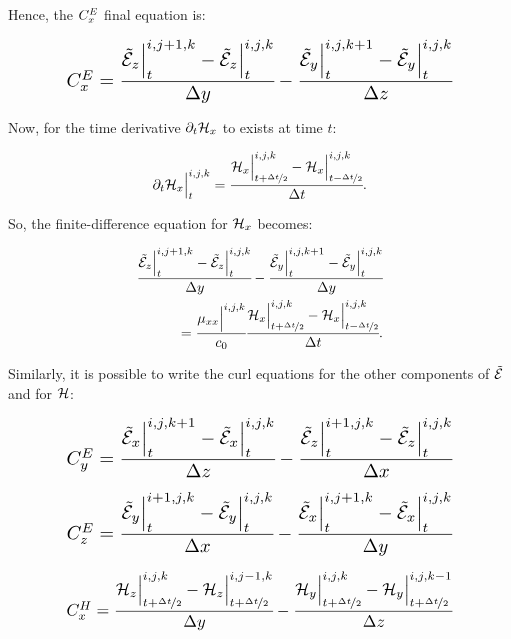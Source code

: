 Hence, the $C_x^E$ final equation is:

\begin{align}
    \resizebox{.8\hsize}{!}{$
        \CEx = \cfrac{\En_z\Big|^{i,j+1,k}_t-\En_z\Big|^{i,j,k}_t}{\dy} - \cfrac{\En_y\Big|^{i,j,k+1}_t-\En_y\Big|^{i,j,k}_t}{\dz}
        \label{eq:CEx}
    $}
\end{align}


Now, for the time derivative $\partial_t \mathcal{H}_x$ to exists at time $t$:

\begin{equation}
    \partial_t \mathcal{H}_x\Big|^{i,j,k}_t = \cfrac{\mathcal{H}_x\Big|^{i,j,k}_{t+\nicefrac{\Delta t}{2}} - \mathcal{H}_x\Big|^{i,j,k}_{t-\nicefrac{\Delta t}{2}}}{\Delta t}.
\end{equation}

So, the finite-difference equation for $\mathcal{H}_x$ becomes:

\begin{align}
    \cfrac{\tilde{\mathcal{E}}_z\Big|^{i,j+1,k}_{t}-\tilde{\mathcal{E}}_z\Big|^{i,j,k}_{t}}{\Delta y} - \cfrac{\tilde{\mathcal{E}}_y\Big|^{i,j,k+1}_{t}-\tilde{\mathcal{E}}_y\Big|^{i,j,k}_{t}}{\Delta y} \nonumber \\ 
    =\cfrac{\mu_{xx}\Big|^{i,j,k}}{c_0}\cfrac{\mathcal{H}_x\Big|^{i,j,k}_{t+\nicefrac{\Delta t}{2}} - \mathcal{H}_x\Big|^{i,j,k}_{t-\nicefrac{\Delta t}{2}}}{\Delta t}.
    \label{eq:fd_hx}
\end{align}

Similarly, it is possible to write the curl equations for the other components of $\tilde{\mathcal{E}}$ and for $\mathcal{H}$:



\begin{align}
    \resizebox{.8\hsize}{!}{$
    \CEy = \cfrac{\En_x\Big|^{i,j,k+1}_{t}-\En_x\Big|^{i,j,k}_{t}}{\dz} - \cfrac{\En_z\Big|^{i+1,j,k}_{t}-\En_z\Big|^{i,j,k}_{t}}{\dx}
    \label{eq:CEy}
    $}
\end{align}

\begin{align}
    \resizebox{.8\hsize}{!}{$
        \CEz = \cfrac{\En_y\Big|^{i+1,j,k}_{t}-\En_y\Big|^{i,j,k}_{t}}{\dx} - \cfrac{\En_x\Big|^{i,j+1,k}_{t}-\En_x\Big|^{i,j,k}_{t}}{\dy}
        \label{eq:CEz}
    $}
\end{align}

\begin{align}
    \resizebox{.8\hsize}{!}{$
        \CHx = \cfrac{\Hht_z\Big|^{i,j,k}_{t+\nicefrac{\dt}{2}}-\Hht_z\Big|^{i,j-1,k}_{t+\nicefrac{\dt}{2}}}{\dy} - \cfrac{\Hht_y\Big|^{i,j,k}_{t+\nicefrac{\dt}{2}}-\Hht_y\Big|^{i,j,k-1}_{t+\nicefrac{\dt}{2}}}{\dz}
        \label{eq:CHx}
    $}
\end{align}


